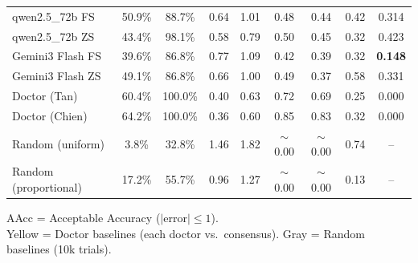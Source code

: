 \documentclass[aspectratio=169]{beamer}
\begin{document}
\begin{frame}
{{\begin{table}
\begin{tabular}{lcccccccc}
        qwen2.5\_72b FS     & 50.9\% & 88.7\% & 0.64 & 1.01 & 0.48 & 0.44 & 0.42 & 0.314 \\
        qwen2.5\_72b ZS     & 43.4\% & 98.1\% & 0.58 & 0.79 & 0.50 & 0.45 & 0.32 & 0.423 \\
        Gemini3 Flash FS    & 39.6\% & 86.8\% & 0.77 & \cellcolor{red!15}1.09 & 0.42 & 0.39 & 0.32 & \cellcolor{green!15}\textbf{0.148} \\
        Gemini3 Flash ZS    & 49.1\% & 86.8\% & 0.66 & 1.00 & 0.49 & 0.37 & \cellcolor{red!15}0.58 & 0.331 \\
        \midrule
        \rowcolor{yellow!12}
        Doctor (Tan)        & 60.4\% & 100.0\% & 0.40 & 0.63 & 0.72 & 0.69 & 0.25 & 0.000 \\
        \rowcolor{yellow!12}
        Doctor (Chien)      & 64.2\% & 100.0\% & 0.36 & 0.60 & 0.85 & 0.83 & 0.32 & 0.000 \\
        \rowcolor{gray!12}
        Random (uniform)    & 3.8\% & 32.8\% & 1.46 & 1.82 & $\sim$0.00 & $\sim$0.00 & 0.74 & -- \\
        \rowcolor{gray!12}
        Random (proportional) & 17.2\% & 55.7\% & 0.96 & 1.27 & $\sim$0.00 & $\sim$0.00 & 0.13 & -- \\
        \bottomrule
        \end{tabular}
    \end{table}
    }
    }
    \vspace{0.3em}
    \footnotesize{AAcc = Acceptable Accuracy ($|$error$|\leq 1$).\\
    \colorbox{yellow!12}{Yellow} = Doctor baselines (each doctor vs.\ consensus). \colorbox{gray!12}{Gray} = Random baselines (10k trials).}
\end{frame}
\end{document}
